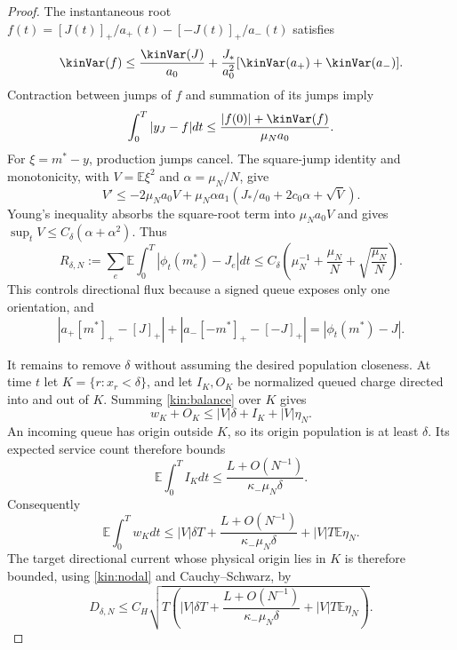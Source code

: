 \documentclass[11pt,oneside,openany]{book}
\theoremstyle{definition}
\theoremstyle{remark}\newtheorem{remark}[theorem]{Remark}
\begin{document}
\begin{proof}
The instantaneous root
$f(t)=[J(t)]_+/a_+(t)-[-J(t)]_+/a_-(t)$ satisfies
\[
 \kinVar(f)\le \frac{\kinVar(J)}{a_0}
 +\frac{J_*}{a_0^2}[\kinVar(a_+)+\kinVar(a_-)].
\]
Contraction between jumps of $f$ and summation of its jumps imply
\[
 \int_0^T|y_J-f|dt\le\frac{|f(0)|+\kinVar(f)}{\mu_Na_0}.
\]
For $\xi=m^*-y$, production jumps cancel. The square-jump identity and
monotonicity, with $V=\mathbb E\xi^2$ and $\alpha=\mu_N/N$, give
\[
 V'\le-2\mu_Na_0V+
 \mu_N\alpha a_1(J_*/a_0+2c_0\alpha+\sqrt V).
\]
Young's inequality absorbs the square-root term into $\mu_Na_0V$ and
gives $\sup_tV\le C_\delta(\alpha+\alpha^2)$. Thus
\begin{equation}
 R_{\delta,N}:=\sum_e\mathbb E\int_0^T|\phi_t(m_e^*)-J_e|dt
 \le C_\delta\left(\mu_N^{-1}+\frac{\mu_N}{N}
 +\sqrt{\frac{\mu_N}{N}}\right).
 \label{kin:R}
\end{equation}
This controls directional flux because a signed queue exposes only one
orientation, and
\[
 |a_+[m^*]_+-[J]_+|+|a_-[-m^*]_+-[-J]_+|
 =|\phi_t(m^*)-J|.
\]

It remains to remove $\delta$ without assuming the desired population
closeness. At time $t$ let $K=\{r:x_r<\delta\}$, and let $I_K,O_K$ be
normalized queued charge directed into and out of $K$. Summing
\eqref{kin:balance} over $K$ gives
\[
 w_K+O_K\le |V|\delta+I_K+|V|\eta_N.
\]
An incoming queue has origin outside $K$, so its origin population is at
least $\delta$. Its expected service count therefore bounds
\[
 \mathbb E\int_0^TI_Kdt\le
 \frac{L+O(N^{-1})}{\kappa_-\mu_N\delta}.
\]
Consequently
\begin{equation}
 \mathbb E\int_0^Tw_Kdt\le |V|\delta T+
 \frac{L+O(N^{-1})}{\kappa_-\mu_N\delta}+|V|T\mathbb E\eta_N.
 \label{kin:smallmass}
\end{equation}
The target directional current whose physical origin lies in $K$ is
therefore bounded, using \eqref{kin:nodal} and Cauchy--Schwarz, by
\begin{equation}
 D_{\delta,N}\le C_H\sqrt{T\left(|V|\delta T+
 \frac{L+O(N^{-1})}{\kappa_-\mu_N\delta}+|V|T\mathbb E\eta_N\right)}.
 \label{kin:smallflux}
\end{equation}


\end{proof}
\end{document}
